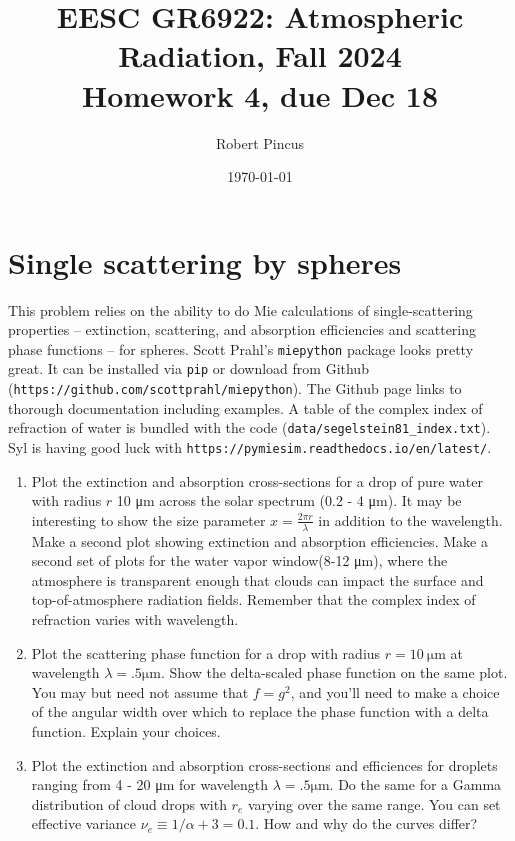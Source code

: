 \documentclass{article}
\title{EESC GR6922: Atmospheric Radiation, Fall 2024 \\ Homework 4, due Dec 18}
\author{Robert Pincus}
\date{\today}
\begin{document}
\maketitle

\section{Single scattering by spheres}

This problem relies on the ability to do Mie calculations of single-scattering properties -- extinction, scattering, and absorption efficiencies and  scattering phase functions -- for spheres. Scott Prahl's {\tt miepython} package looks pretty great. It can be installed via {\tt pip} or download from Github ({\tt https://github.com/scottprahl/miepython}). The Github page links to thorough documentation including examples. A table of the complex index of refraction of water is bundled with the code ({\tt data/segelstein81\_index.txt}). Syl is having good luck with  {\tt https://pymiesim.readthedocs.io/en/latest/}. 

\begin{enumerate}

\item Plot the extinction and absorption cross-sections for a drop of pure water with radius $r$ 10 \si{\micro\meter} across the solar spectrum (0.2 - 4 \si{\micro\meter}). It may be interesting to show the size parameter $x = \frac{2 \pi r}{\lambda}$ in addition to the wavelength. Make a second plot showing extinction and absorption efficiencies. Make a second set of plots for the water vapor window(8-12 \si{\micro\meter}), where the atmosphere is transparent enough that clouds can impact the surface and top-of-atmosphere radiation fields. Remember that the complex index of refraction varies with wavelength. 

\item Plot the scattering phase function for a drop with radius $r = 10~\si{\micro\meter}$ at  wavelength $\lambda = .5  \si{\micro\meter}$. Show the delta-scaled phase function on the same plot. You may but need not assume that $f = g^2$, and you'll need to make a choice of the angular width over which to replace the phase function with a delta function. Explain your choices. 

\item Plot the extinction and absorption cross-sections and efficiences for droplets ranging from 4 - 20 \si{\micro\meter} for wavelength $\lambda = .5  \si{\micro\meter}$. Do the same for a Gamma distribution of cloud drops with $r_e$ varying over the same range. You can set effective variance $\nu_e \equiv 1/{\alpha+3} = 0.1.$ How and why do the curves differ? 

\end{enumerate}
\end{document}
